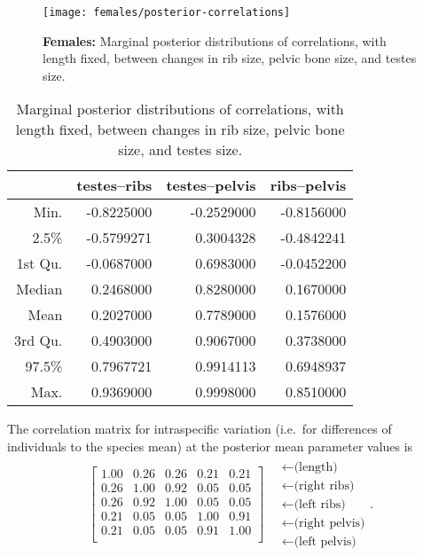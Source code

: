 \documentclass{article}
\begin{document}
\begin{figure}[ht]
  \begin{center}
    \texttt{[image: females/posterior-correlations]}
  \end{center}
  \caption{\textbf{Females:} Marginal posterior distributions of correlations, with length fixed,
  between changes in rib size, pelvic bone size, and testes size.
  \label{fig:female_posterior_cors}
  }
\end{figure}


\begin{table}[ht]
\centering
\begin{tabular}{rrrr}
  \hline
        &  testes--ribs & testes--pelvis & ribs--pelvis \\
  \hline
 Min. &    -0.8225000  &  -0.2529000 & -0.8156000 \\
 2.5\% &   -0.5799271  &   0.3004328 & -0.4842241 \\
 1st Qu. & -0.0687000  &   0.6983000 & -0.0452200 \\
 Median &   0.2468000  &   0.8280000 &  0.1670000 \\
 Mean &     0.2027000  &   0.7789000 &  0.1576000 \\
 3rd Qu. &  0.4903000  &   0.9067000 &  0.3738000 \\
 97.5\%  &  0.7967721  &   0.9914113 &  0.6948937 \\
 Max. &     0.9369000  &   0.9998000 &  0.8510000 \\
   \hline
\end{tabular}
  \caption{Marginal posterior distributions of correlations, with length fixed,
  between changes in rib size, pelvic bone size, and testes size.
  \label{tab:females_posterior_cors}
}
\end{table}

The correlation matrix for intraspecific variation 
(i.e.\ for differences of individuals to the species mean)
at the posterior mean parameter values is
\begin{align}
\begin{bmatrix}
   1.00 & 0.26 & 0.26 & 0.21 & 0.21 \\ 
   0.26 & 1.00 & 0.92 & 0.05 & 0.05 \\ 
   0.26 & 0.92 & 1.00 & 0.05 & 0.05 \\ 
   0.21 & 0.05 & 0.05 & 1.00 & 0.91 \\ 
   0.21 & 0.05 & 0.05 & 0.91 & 1.00 \\ 
 \end{bmatrix}
\quad \begin{matrix}
  \leftarrow \text{(length)} \\
  \leftarrow \text{(right ribs)} \\
  \leftarrow \text{(left ribs)} \\
  \leftarrow \text{(right pelvis)} \\
  \leftarrow \text{(left pelvis)} 
\end{matrix}  .
\end{align}
\end{document}
